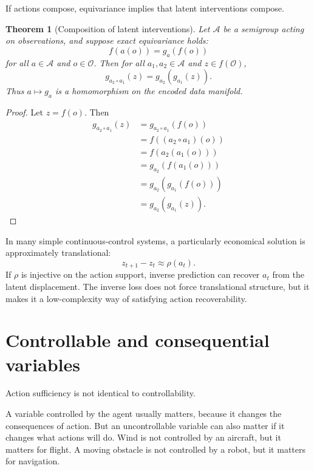 \documentclass[11pt]{article}
\newtheorem{theorem}{Theorem}
\theoremstyle{remark}
\newcommand{\Acal}{\mathcal A}
\newcommand{\Ocal}{\mathcal O}
\newcommand{\1}{\mathbb 1}
\begin{document}
If actions compose, equivariance implies that latent interventions compose.

\begin{theorem}[Composition of latent interventions]
Let $\Acal$ be a semigroup acting on observations, and suppose exact equivariance holds:
\begin{equation}
    f(a(o))=g_a(f(o))
\end{equation}
for all $a\in\Acal$ and $o\in\Ocal$. Then for all $a_1,a_2\in\Acal$ and $z\in f(\Ocal)$,
\begin{equation}
    g_{a_2\circ a_1}(z)=g_{a_2}(g_{a_1}(z)).
\end{equation}
Thus $a\mapsto g_a$ is a homomorphism on the encoded data manifold.
\end{theorem}

\begin{proof}
Let $z=f(o)$. Then
\begin{align}
    g_{a_2\circ a_1}(z)
    &= g_{a_2\circ a_1}(f(o)) \\
    &= f((a_2\circ a_1)(o)) \\
    &= f(a_2(a_1(o))) \\
    &= g_{a_2}(f(a_1(o))) \\
    &= g_{a_2}(g_{a_1}(f(o))) \\
    &= g_{a_2}(g_{a_1}(z)).
\end{align}
\end{proof}

In many simple continuous-control systems, a particularly economical solution is approximately translational:
\begin{equation}
    z_{t+1}-z_t \approx \rho(a_t).
    \label{eq:latent-translation}
\end{equation}
If $\rho$ is injective on the action support, inverse prediction can recover $a_t$ from the latent displacement. The inverse loss does not force translational structure, but it makes it a low-complexity way of satisfying action recoverability.

\section{Controllable and consequential variables}

Action sufficiency is not identical to controllability.

A variable controlled by the agent usually matters, because it changes the consequences of action. But an uncontrollable variable can also matter if it changes what actions will do. Wind is not controlled by an aircraft, but it matters for flight. A moving obstacle is not controlled by a robot, but it matters for navigation.
\end{document}
